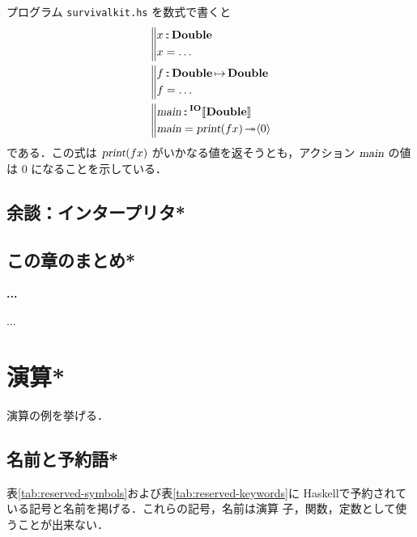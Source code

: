 \documentclass[a5paper,twoside,fleqn,draft]{jsbook}
\def\[{[\![}
\def\]{]\!]}
\newcommand{\programminglanguage}[1]{\textsf{#1}}
\newcommand{\haskell}{\programminglanguage{Haskell}}
\newenvironment{leader}{\begingroup\gt}{\endgroup}
\newenvironment{note}[1]{\begin{boxnote}\begin{center}\textbf{#1}\end{center}}{\end{boxnote}}
\newcommand{\filename}[1]{\texttt{#1}}
\newcommand{\mBrace}{\Vert}
\newcommand{\mAction}[1]{\textsl{#1}}
\DeclareMathOperator{\mMain}{\mAction{main}}
\DeclareMathOperator{\mPrint}{\mAction{print}}
\DeclareMathOperator{\mBindRightIgnore}{\twoheadrightarrow}
\DeclareMathOperator{\mIn}{{:\!:}}
\DeclareMathOperator{\mMapsTo}{\mapsto}
\newcommand{\mType}[1]{\mathbf{#1}} %
\newcommand{\mDoubleType}{\mType{Double}}
\newcommand{\mTypeAssemble}[2]{{}^{\mType{#1}}\[\mType{#2}\]}
\newcommand{\mIOType}[1]{\mTypeAssemble{IO}{#1}}
\newcommand{\mIODoubleType}{\mIOType{\mDoubleType}}
\newcommand{\mPureWith}[1]{\langle#1\rangle}
\newcommand{\mProjEXP}[2]{#1\mMapsTo#2} %
\begin{document}
プログラム \filename{survivalkit.hs} を数式で書くと
\begin{align}
  {}&\left\mBrace
    \begin{aligned}
      x&\mIn\mDoubleType\\
      x&=\dots\\
    \end{aligned}
    \right.\\
  {}&\left\mBrace
    \begin{aligned}
      f&\mIn{}\mProjEXP{\mDoubleType}{\mDoubleType}\\
      f&=\dots\\
    \end{aligned}
    \right.\\
  {}&\left\mBrace
    \begin{aligned}
      \mMain&\mIn{}\mIODoubleType\\
      \mMain&=\mPrint(fx)\mBindRightIgnore\mPureWith{0}
    \end{aligned}
    \right.
\end{align}
である．この式は $\mPrint(fx)$ がいかなる値を返そうとも，アクション
$\mMain$ の値は $0$ になることを示している．

\section{余談：インタープリタ*}

\section{この章のまとめ*}

\begin{note}{...}
...
\end{note}

\chapter{演算*}
\label{ch:arithmetic}

\begin{leader}
演算の例を挙げる．
\end{leader}


\section{名前と予約語*}

表\ref{tab:reserved-symbols}および表\ref{tab:reserved-keywords}に
\haskell で予約されている記号と名前を掲げる．これらの記号，名前は演算
子，関数，定数として使うことが出来ない．
\end{document}
